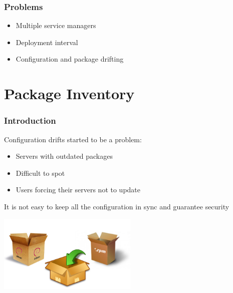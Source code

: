 \documentclass[aspectratio=169]{beamer}
\begin{document}

\begin{frame}
    \frametitle{Problems}
    \begin{itemize}
        \item Multiple service managers
        \item Deployment interval
        \item Configuration and package drifting
    \end{itemize}
\end{frame}

\section{Package Inventory}

\begin{frame}
    \frametitle{Introduction}
    \vspace{10px}
    \begin{minipage}[t]{0.95\textwidth}
        Configuration drifts started to be a problem:
        \begin{itemize}
            \item Servers with outdated packages
            \item Difficult to spot
            \item Users forcing their servers not to update
        \end{itemize}
        It is not easy to keep all the configuration in sync and guarantee security
    \end{minipage}
    \vspace{\belowdisplayskip}
    \begin{minipage}[t]{0.95\textwidth}
        \begin{center}
            \includegraphics[width=0.5\textwidth]{package.png}
        \end{center}
    \end{minipage}
\end{frame}
\end{document}

